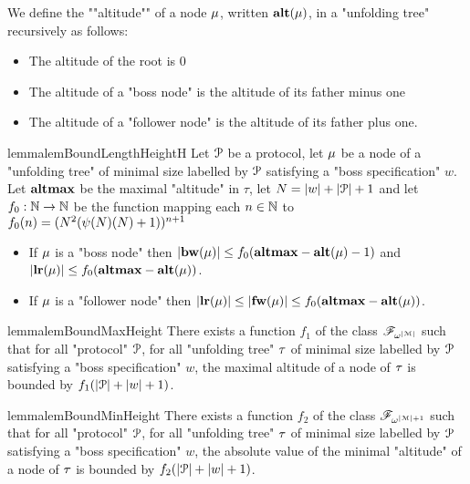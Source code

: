 \begin{definition}
	We define the ""altitude"" of a node $\mu$, written $\mathbf{alt}(\mu)$, in a "unfolding tree" recursively as follows:
	\begin{itemize}
		\item The altitude of the root is $0$
		
		\item The altitude of a "boss node" is the altitude of its father minus one
		
		\item The altitude of a "follower node" is the altitude of its father plus one.
	\end{itemize}
\end{definition}

\begin{restatable}{lemma}{lemBoundLengthHeightH}
	\label{lem:bound-length-at-height-h}
	Let $\mathcal{P}$ be a protocol, let $\mu$ be a node of a "unfolding tree" of minimal size labelled by $\mathcal{P}$ satisfying a "boss specification" $w$.
	Let $\mathbf{altmax}$ be the maximal "altitude" in $\tau$, let $N = |w| + |\mathcal{P}| +1$ and let $f_0 : \mathbb{N} \to \mathbb{N}$ be the function mapping each $n \in \mathbb{N}$ to $f_0(n)=(N^2 (\psi(N)(N) + 1))^{n+1}$ 
	
	\begin{itemize}
		\item If $\mu$ is a "boss node" then $|\mathbf{bw}(\mu)| \leq f_0(\mathbf{altmax} - \mathbf{alt}(\mu)-1)$ and $|\mathbf{lr}(\mu)| \leq f_0(\mathbf{altmax} - \mathbf{alt}(\mu))$.
		
		\item If $\mu$ is a "follower node" then $|\mathbf{lr}(\mu)| \leq |\mathbf{fw}(\mu)| \leq  f_0(\mathbf{altmax} - \mathbf{alt}(\mu))$.
	\end{itemize} 
\end{restatable}

\begin{restatable}{lemma}{lemBoundMaxHeight}
	\label{lem:bound-max-height}
	There exists a function $f_1$ of the class $\mathscr{F}_{\omega^{|\mathcal{M}|}}$ such that for all "protocol" $\mathcal{P}$, for all "unfolding tree" $\tau$ of minimal size labelled by $\mathcal{P}$ satisfying a "boss specification" $w$, the maximal altitude of a node of $\tau$ is bounded by $f_1(|\mathcal{P}| + |w|+1)$.
\end{restatable}


\begin{restatable}{lemma}{lemBoundMinHeight}
	\label{lem:bound-min-height}
	There exists a function $f_2$ of the class $\mathscr{F}_{\omega^{|\mathcal{M}|+1}}$ such that for all "protocol" $\mathcal{P}$, for all "unfolding tree" $\tau$ of minimal size labelled by $\mathcal{P}$ satisfying a "boss specification" $w$, the absolute value of the minimal "altitude" of a node of $\tau$ is bounded by $f_2(|\mathcal{P}| + |w|+1)$.
\end{restatable}



